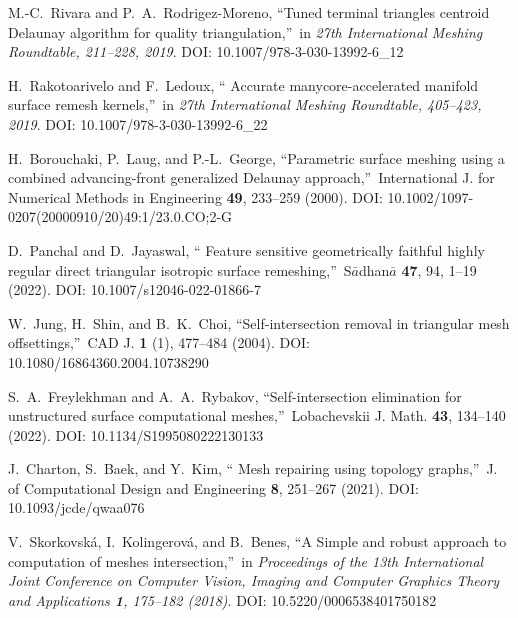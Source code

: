 \documentclass[
11pt,
tightenlines,
twoside,
onecolumn,
nofloats,
nobibnotes,
nofootinbib,
superscriptaddress,
noshowpacs,
centertags]
{revtex4}
\begin{document}
\begin{thebibliography}{99}
 M.-C.~Rivara and P.~A.~Rodrigez-Moreno,
\textquotedblleft Tuned terminal  triangles centroid Delaunay
algorithm for quality triangulation,\textquotedblright \ in
\textit{27th International Meshing Roundtable, 211--228, 2019}. DOI: 10.1007/978-3-030-13992-6\_12

 H.~Rakotoarivelo and F.~Ledoux, \textquotedblleft
Accurate manycore-accelerated  manifold surface remesh
kernels,\textquotedblright \ in \textit{27th International Meshing
Roundtable, 405--423, 2019}. DOI: 10.1007/978-3-030-13992-6\_22

 H.~Borouchaki, P.~Laug, and P.-L.~George,
\textquotedblleft Parametric surface meshing using a combined
advancing-front generalized Delaunay approach,\textquotedblright \
International J. for Numerical Methods in Engineering {\bf 49},
233--259 (2000). DOI: 10.1002/1097-0207(20000910/20)49:1/23.0.CO;2-G

 D.~Panchal and D.~Jayaswal, \textquotedblleft
Feature  sensitive geometrically faithful highly regular direct
triangular isotropic surface remeshing,\textquotedblright \
S$\bar{a}$dhan$\bar{a}$ {\bf 47}, 94, 1--19 (2022). DOI: 10.1007/s12046-022-01866-7

\bibitem{Jung}
 W.~Jung, H.~Shin, and B.~K.~Choi,
\textquotedblleft Self-intersection  removal in triangular mesh
offsettings,\textquotedblright \ CAD J. {\bf 1} (1), 477--484
(2004). DOI: 10.1080/16864360.2004.10738290

 S.~A.~Freylekhman and A.~A.~Rybakov,
\textquotedblleft Self-intersection elimination  for unstructured
surface computational meshes,\textquotedblright \ Lobachevskii J.
Math. {\bf 43}, 134--140 (2022). DOI: 10.1134/S1995080222130133

\bibitem{Charton}
 J.~Charton, S.~Baek, and Y.~Kim, \textquotedblleft
Mesh repairing using topology graphs,\textquotedblright \ J. of
Computational Design and Engineering {\bf 8}, 251--267 (2021). DOI: 10.1093/jcde/qwaa076

\bibitem{Skvorkovska}
 V.~Skorkovsk\'a, I.~Kolingerov\'a, and B.~Benes,
\textquotedblleft A Simple  and robust approach to computation of
meshes intersection,\textquotedblright \ in \textit{Proceedings of
the 13th International Joint Conference on Computer Vision, Imaging
and Computer Graphics Theory and Applications {\bf 1}, 175--182
(2018)}. DOI: 10.5220/0006538401750182

\end{thebibliography}
\end{document}
